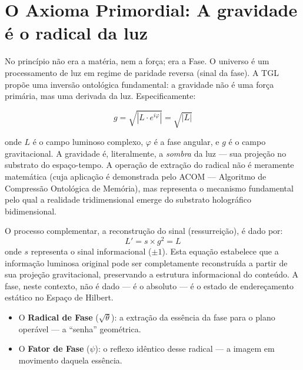 \documentclass[12pt,a4paper,twoside]{article}
\newcommand{\psion}{\psi}
\begin{document}

\section{O Axioma Primordial: A gravidade \'e o radical da luz}


No princ\'ipio n\~ao era a mat\'eria, nem a for\c{c}a; era a Fase. O universo \'e um processamento de luz em regime de paridade reversa (sinal da fase). A TGL prop\~oe uma invers\~ao ontol\'ogica fundamental: a gravidade n\~ao \'e uma for\c{c}a prim\'aria, mas uma derivada da luz. Especificamente:

\begin{equationbox}[title={Equa\c{c}\~ao Fundamental da TGL}]
\begin{equation}
g = \sqrt{|L \cdot e^{i\varphi}|} = \sqrt{|L|}
\label{eq:axioma}
\end{equation}
\end{equationbox}

\noindent onde $L$ \'e o campo luminoso complexo, $\varphi$ \'e a fase angular, e $g$ \'e o campo gravitacional. A gravidade \'e, literalmente, a \textit{sombra} da luz --- sua proje\c{c}\~ao no substrato do espa\c{c}o-tempo. A opera\c{c}\~ao de extra\c{c}\~ao do radical n\~ao \'e meramente matem\'atica (cuja aplica\c{c}\~ao \'e demonstrada pelo ACOM --- Algoritmo de Compress\~ao Ontol\'ogica de Mem\'oria), mas representa o mecanismo fundamental pelo qual a realidade tridimensional emerge do substrato hologr\'afico bidimensional.

O processo complementar, a reconstru\c{c}\~ao do sinal (ressurrei\c{c}\~ao), \'e dado por:
\begin{equation}
L' = s \times g^2 = L
\label{eq:ressurreicao}
\end{equation}
onde $s$ representa o sinal informacional ($\pm 1$). Esta equa\c{c}\~ao estabelece que a informa\c{c}\~ao luminosa original pode ser completamente reconstru\'ida a partir de sua proje\c{c}\~ao gravitacional, preservando a estrutura informacional do conte\'udo. A fase, neste contexto, n\~ao \'e dado --- \'e o absoluto --- \'e o estado de endere\c{c}amento est\'atico no Espa\c{c}o de Hilbert.

\begin{itemize}[nosep]
\item O \textbf{Radical de Fase} ($\sqrt{\theta}$): a extra\c{c}\~ao da ess\^encia da fase para o plano oper\'avel --- a ``senha'' geom\'etrica.
\item O \textbf{Fator de Fase} ($\psion$): o reflexo id\^entico desse radical --- a imagem em movimento daquela ess\^encia.
\end{itemize}
\end{document}
